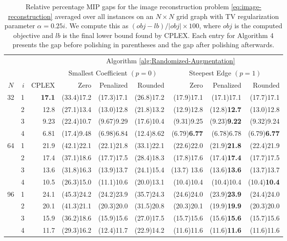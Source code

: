 \documentclass[pdflatex,sn-mathphys-num]{sn-jnl}%
\begin{document}
\begin{table}[]
    \centering
\begin{tabular}{cr|r|rrr|rrr}
 &  &       & \multicolumn{6}{c}{Algorithm \ref{alg:Randomized-Augmentation}} \\
 &  &       & \multicolumn{3}{c}{Smallest Coefficient $(p=0)$} & \multicolumn{3}{|c}{Steepest Edge $(p=1)$} \\ $N$ & $i$ & CPLEX & Zero & Penalized & Rounded & Zero & Penalized & Rounded \\
\hline
\multirow[t]{4}{*}{32} & 1 & \textbf{17.1} & (33.4)17.2 & (17.3)17.1 & (26.8)17.2 & (17.9)17.1 & (17.1)17.1 & (17.7)17.1 \\
 & 2 & 12.8 & (27.1)13.4 & (13.0)12.8 & (21.8)13.2 & (12.9)12.8 & (12.8)\textbf{12.7} & (13.0)12.8 \\
 & 3 & 9.23 & (22.4)10.7 & (9.67)9.29 & (17.6)10.4 & (9.31)9.25 & (9.23)\textbf{9.22} & (9.32)9.24 \\
 & 4 & 6.81 & (17.4)9.48 & (6.98)6.84 & (12.4)8.62 & (6.79)\textbf{6.77} & (6.78)6.78 & (6.79)\textbf{6.77} \\
\hline
\multirow[t]{4}{*}{64} & 1 & 21.9 & (42.1)22.1 & (22.1)21.8 & (33.1)22.1 & (22.6)22.0 & (21.9)\textbf{21.8} & (22.4)21.9 \\
 & 2 & 17.4 & (37.1)18.6 & (17.7)17.5 & (28.4)18.3 & (17.8)17.6 & (17.4)\textbf{17.4} & (17.7)17.5 \\
 & 3 & 13.6 & (31.8)16.3 & (13.9)13.7 & (24.1)15.4 & (13.7) 13.6 & (13.6)\textbf{13.6} & (13.7)13.7 \\
 & 4 & 10.5 & (26.3)15.0 & (11.1)10.6 & (20.0)13.1 & (10.4)10.4 & (10.4)10.4 & (10.4)\textbf{10.4} \\
\hline
\multirow[t]{4}{*}{96} & 1 & 24.1 & (45.3)24.2 & (24.2)23.9 & (35.7)24.3 & (24.6)24.0 & (23.9)\textbf{23.9} & (24.4)24.0 \\
 & 2 & 20.1 & (41.3)21.1 & (20.3)20.0 & (31.5)20.8 & (20.3)20.1 & (19.9)\textbf{19.9} & (20.3)20.0 \\
 & 3 & 15.9 & (36.2)18.6 & (15.9)15.6 & (27.0)17.5 & (15.7)15.6 & (15.6)\textbf{15.6} & (15.7)15.6 \\
 & 4 & 11.7 & (29.3)16.2 & (12.4)11.7 & (22.9)14.2 & (11.6)11.6 & (11.6)\textbf{11.6} & (11.6)11.6 \\
\end{tabular}
    \caption{Relative percentage MIP gaps for the image reconstruction problem  \eqref{eq:image-reconstruction} averaged over all instances on an $N\times N$ grid graph with TV regularization parameter $\alpha = 0.25i$. We compute this as $(obj - lb)/|obj| \times 100$, where $obj$ is the computed objective and $lb$ is the final lower bound found by CPLEX. Each entry for Algorithm 4 presents the gap before polishing in parentheses and the gap after polishing afterwards.}
    \label{tab:image-gaps}
\end{table}
\end{document}
